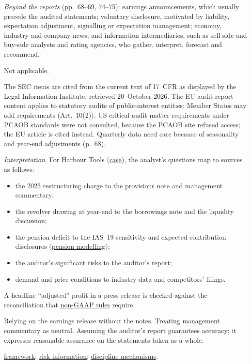 \begin{qfdefinition}
\emph{Beyond the reports} (pp.~68--69, 74--75): earnings announcements, which usually precede the audited statements; voluntary disclosure, motivated by liability, expectation adjustment, signalling or expectation management; economy, industry and company news; and information intermediaries, such as sell-side and buy-side analysts and rating agencies, who gather, interpret, forecast and recommend.

 Not applicable.

 The SEC items are cited from the current text of 17~CFR as displayed by the Legal Information Institute, retrieved 20~October 2026. The EU audit-report content applies to statutory audits of public-interest entities; Member States may add requirements (Art.~10(2)). US critical-audit-matter requirements under PCAOB standards were not consulted, because the PCAOB site refused access; the EU article is cited instead. Quarterly data need care because of seasonality and year-end adjustments (p.~68).

 \emph{Interpretation.} For Harbour Tools (\hyperref[ex:harbour-tools-statements]{case}), the analyst's questions map to sources as follows:
\begin{itemize}
\item the 2025 restructuring charge to the provisions note and management commentary;
\item the revolver drawing at year-end to the borrowings note and the liquidity discussion;
\item the pension deficit to the IAS~19 sensitivity and expected-contribution disclosures (\hyperref[meth:post-employment-benefit-modelling]{pension modelling});
\item the auditor's significant risks to the auditor's report;
\item demand and price conditions to industry data and competitors' filings.
\end{itemize}
A headline ``adjusted'' profit in a press release is checked against the reconciliation that \hyperref[meth:earnings-management-presentation]{non-GAAP rules} require.

 Relying on the earnings release without the notes. Treating management commentary as neutral. Assuming the auditor's report guarantees accuracy; it expresses reasonable assurance on the statements taken as a whole.

 \hyperref[def:statement-analysis-framework]{framework}; \hyperref[meth:cash-flow-balance-sheet-quality]{risk information}; \hyperref[def:reporting-incentives-discipline]{discipline mechanisms}.

\end{qfdefinition}

